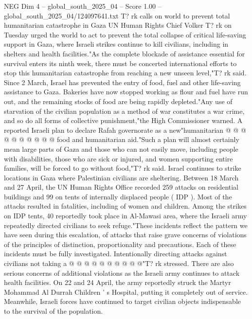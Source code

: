 \begin{textsample}{NEG Dim 4 – global\_south\_2025\_04 – Score 1.00 – global\_south\_2025\_04/124097641.txt}  \label{ex:f4_neg_235}
T? rk calls on world to prevent total humanitarian catastrophe in Gaza UN Human Rights Chief Volker T? rk on Tuesday urged the world to act to prevent the total collapse of critical life-saving support in Gaza, where Israeli strikes continue to kill civilians, including in shelters and health facilities."As the complete blockade of assistance essential for survival enters its ninth week, there must be concerted international efforts to stop this humanitarian catastrophe from reaching a new unseen level,"T? rk said.
Since 2 March, Israel has prevented the entry of food, fuel and other life-saving assistance to Gaza.
Bakeries have now stopped working as flour and fuel have run out, and the remaining stocks of food are being rapidly depleted."Any use of starvation of the civilian population as a method of war constitutes a war crime, and so do all forms of collective punishment,"the High Commissioner warned.
A reported Israeli plan to declare Rafah governorate as a new"humanitarian @ @ @ @ @ @ @ @ @ @ food and humanitarian aid."Such a plan will almost certainly mean large parts of Gaza and those who can not easily move, including people with disabilities, those who are sick or injured, and women supporting entire families, will be forced to go without food,"T? rk said.
Israel continues to strike locations in Gaza where Palestinian civilians are sheltering.
Between 18 March and 27 April, the UN Human Rights Office recorded 259 attacks on residential buildings and 99 on tents of internally displaced people ( IDP ).
Most of the attacks resulted in fatalities, including of women and children.
Among the strikes on IDP tents, 40 reportedly took place in Al-Mawasi area, where the Israeli army repeatedly directed civilians to seek refuge."These incidents reflect the pattern we have seen during this escalation, of attacks that raise grave concerns of violations of the principles of distinction, proportionality and precautions.
Each of these incidents must be fully investigated.
Intentionally directing attacks against civilians not taking a @ @ @ @ @ @ @ @ @ @"T? rk stressed.
There are also serious concerns of additional violations as the Israeli army continues to attack health facilities.
On 22 and 24 April, the army reportedly struck the Martyr Mohammad Al Durrah Children ' s Hospital, putting it completely out of service.
Meanwhile, Israeli forces have continued to target civilian objects indispensable to the survival of the population.

\end{textsample}
